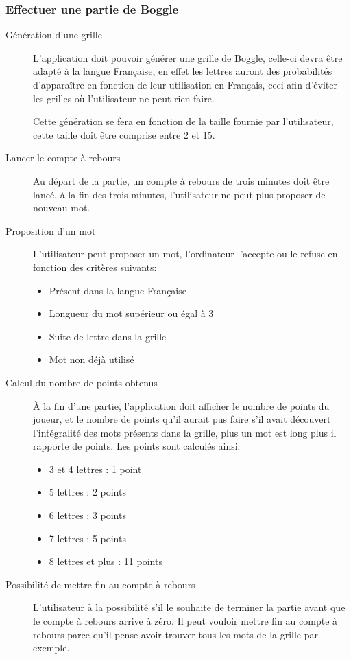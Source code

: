 \documentclass[12pt,a4paper,openany]{article}
\begin{document}
	\subsubsection{Effectuer une partie de Boggle}
		\begin{description}
				\item[Génération d'une grille] L'application doit pouvoir générer une grille de Boggle, celle-ci devra être adapté à la langue Française, en
				effet les lettres auront des probabilités d'apparaître en fonction de leur utilisation en Français, ceci afin d'éviter les grilles où
				l'utilisateur ne peut rien faire.
				
				Cette génération se fera en fonction de la taille fournie par l'utilisateur, cette taille doit être comprise entre 2 et 15.
				\item[Lancer le compte à rebours] Au départ de la partie, un compte à rebours de trois minutes doit être lancé, à la fin des trois
					minutes, l'utilisateur ne peut plus proposer de nouveau mot.
				\item[Proposition d'un mot] L'utilisateur peut proposer un mot, l'ordinateur l'accepte ou le refuse en fonction des critères suivants:
					\begin{itemize}
						\item Présent dans la langue Française
						\item Longueur du mot supérieur ou égal à 3
						\item Suite de lettre dans la grille
						\item Mot non déjà utilisé
					\end{itemize}
				\item[Calcul du nombre de points obtenus] À la fin d'une partie, l'application doit afficher le nombre de points du joueur, et le
					nombre de points qu'il aurait pus faire s'il avait découvert l'intégralité des mots présents dans la grille, plus un mot est long
					plus il rapporte de points. Les points sont calculés ainsi:
					\begin{itemize}
						\item 3 et 4 lettres : 1 point
						\item 5 lettres : 2 points
						\item 6 lettres : 3 points
						\item 7 lettres : 5 points
						\item 8 lettres et plus : 11 points
					\end{itemize}
				\item[Possibilité de mettre fin au compte à rebours] L'utilisateur à la possibilité s'il le souhaite de terminer la partie avant que le
					compte à rebours arrive à zéro. Il peut vouloir mettre fin au compte à rebours parce qu'il pense avoir trouver
					tous les mots de la grille par exemple.
		\end{description}
\end{document}
